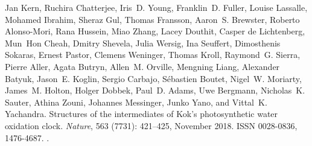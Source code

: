 \documentclass[a4paper]{article}
\begin{document}
\begin{thebibliography}{33}
Jan Kern, Ruchira Chatterjee, Iris~D. Young, Franklin~D. Fuller, Louise
  Lassalle, Mohamed Ibrahim, Sheraz Gul, Thomas Fransson, Aaron~S. Brewster,
  Roberto {Alonso-Mori}, Rana Hussein, Miao Zhang, Lacey Douthit, Casper {de
  Lichtenberg}, Mun~Hon Cheah, Dmitry Shevela, Julia Wersig, Ina Seuffert,
  Dimosthenis Sokaras, Ernest Pastor, Clemens Weninger, Thomas Kroll,
  Raymond~G. Sierra, Pierre Aller, Agata Butryn, Allen~M. Orville, Mengning
  Liang, Alexander Batyuk, Jason~E. Koglin, Sergio Carbajo, S{\'e}bastien
  Boutet, Nigel~W. Moriarty, James~M. Holton, Holger Dobbek, Paul~D. Adams, Uwe
  Bergmann, Nicholas~K. Sauter, Athina Zouni, Johannes Messinger, Junko Yano,
  and Vittal~K. Yachandra.
\newblock Structures of the intermediates of {{Kok}}'s photosynthetic water
  oxidation clock.
\newblock \emph{Nature}, 563 (7731): 421--425, November 2018.
\newblock ISSN 0028-0836, 1476-4687.
\newblock {}.


\end{thebibliography}
\end{document}
